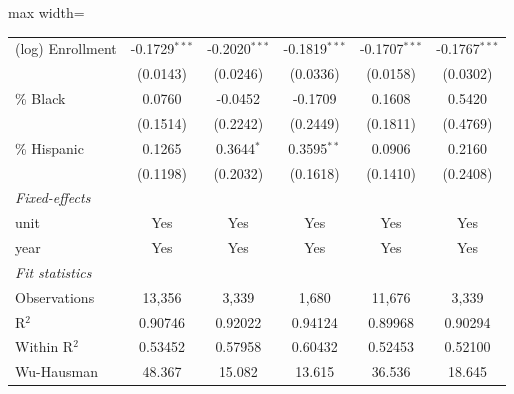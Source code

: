 \documentclass[
  10pt,
]{article}
\begin{document}
\begin{table}[htbp]
\begin{adjustbox}{max width=\textwidth}
\begin{tabular}{lccccc}
         (log) Enrollment                               & -0.1729$^{***}$        & -0.2020$^{***}$        & -0.1819$^{***}$       & -0.1707$^{***}$       & -0.1767$^{***}$\\   
                                                        & (0.0143)               & (0.0246)               & (0.0336)              & (0.0158)              & (0.0302)\\   
         \% Black                                       & 0.0760                 & -0.0452                & -0.1709               & 0.1608                & 0.5420\\   
                                                        & (0.1514)               & (0.2242)               & (0.2449)              & (0.1811)              & (0.4769)\\   
         \% Hispanic                                    & 0.1265                 & 0.3644$^{*}$           & 0.3595$^{**}$         & 0.0906                & 0.2160\\   
                                                        & (0.1198)               & (0.2032)               & (0.1618)              & (0.1410)              & (0.2408)\\   
         \midrule
         \emph{Fixed-effects}\\
         unit                                           & Yes                    & Yes                    & Yes                   & Yes                   & Yes\\  
         year                                           & Yes                    & Yes                    & Yes                   & Yes                   & Yes\\  
         \midrule
         \emph{Fit statistics}\\
         Observations                                   & 13,356                 & 3,339                  & 1,680                 & 11,676                & 3,339\\  
         R$^2$                                          & 0.90746                & 0.92022                & 0.94124               & 0.89968               & 0.90294\\  
         Within R$^2$                                   & 0.53452                & 0.57958                & 0.60432               & 0.52453               & 0.52100\\  
         Wu-Hausman                                     & 48.367                 & 15.082                 & 13.615                & 36.536                & 18.645\\  

\end{tabular}
\end{adjustbox}
\end{table}
\end{document}

